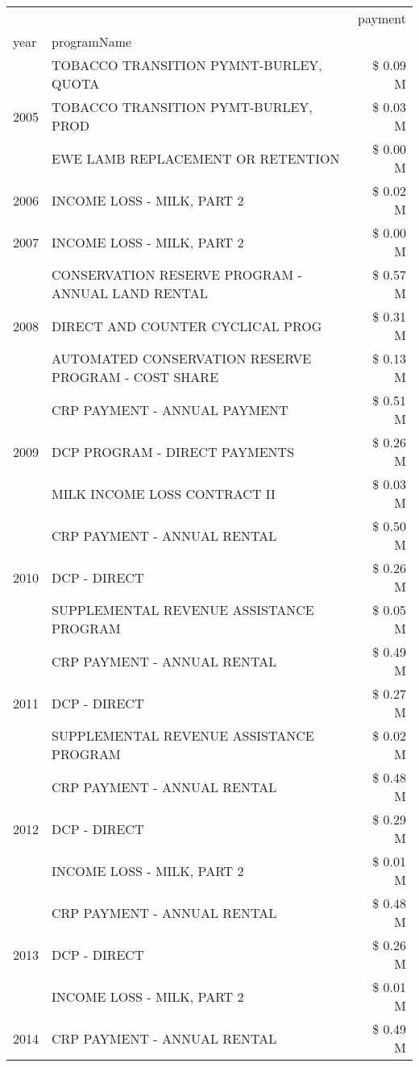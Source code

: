 \begin{tabular}{llr}
\toprule
 &  & payment \\
year & programName &  \\
\midrule
\multirow[t]{3}{*}{2005} & TOBACCO TRANSITION PYMNT-BURLEY, QUOTA & \$ 0.09 M \\
 & TOBACCO TRANSITION PYMT-BURLEY, PROD & \$ 0.03 M \\
 & EWE LAMB REPLACEMENT OR RETENTION & \$ 0.00 M \\
\cline{1-3}
2006 & INCOME LOSS - MILK, PART 2 & \$ 0.02 M \\
\cline{1-3}
2007 & INCOME LOSS - MILK, PART 2 & \$ 0.00 M \\
\cline{1-3}
\multirow[t]{3}{*}{2008} & CONSERVATION RESERVE PROGRAM - ANNUAL LAND RENTAL & \$ 0.57 M \\
 & DIRECT AND COUNTER CYCLICAL PROG & \$ 0.31 M \\
 & AUTOMATED CONSERVATION RESERVE PROGRAM - COST SHARE & \$ 0.13 M \\
\cline{1-3}
\multirow[t]{3}{*}{2009} & CRP PAYMENT - ANNUAL PAYMENT & \$ 0.51 M \\
 & DCP PROGRAM - DIRECT PAYMENTS & \$ 0.26 M \\
 & MILK INCOME LOSS CONTRACT II & \$ 0.03 M \\
\cline{1-3}
\multirow[t]{3}{*}{2010} & CRP PAYMENT - ANNUAL RENTAL & \$ 0.50 M \\
 & DCP - DIRECT & \$ 0.26 M \\
 & SUPPLEMENTAL REVENUE ASSISTANCE PROGRAM & \$ 0.05 M \\
\cline{1-3}
\multirow[t]{3}{*}{2011} & CRP PAYMENT - ANNUAL RENTAL & \$ 0.49 M \\
 & DCP - DIRECT & \$ 0.27 M \\
 & SUPPLEMENTAL REVENUE ASSISTANCE PROGRAM & \$ 0.02 M \\
\cline{1-3}
\multirow[t]{3}{*}{2012} & CRP PAYMENT - ANNUAL RENTAL & \$ 0.48 M \\
 & DCP - DIRECT & \$ 0.29 M \\
 & INCOME LOSS - MILK, PART 2 & \$ 0.01 M \\
\cline{1-3}
\multirow[t]{3}{*}{2013} & CRP PAYMENT - ANNUAL RENTAL & \$ 0.48 M \\
 & DCP - DIRECT & \$ 0.26 M \\
 & INCOME LOSS - MILK, PART 2 & \$ 0.01 M \\
\cline{1-3}
\multirow[t]{2}{*}{2014} & CRP PAYMENT - ANNUAL RENTAL & \$ 0.49 M \\

\end{tabular}
